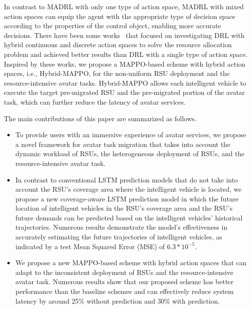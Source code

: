 \documentclass[lettersize,journal]{IEEEtran}
\begin{document}
In contrast to MADRL with only one type of action space, MADRL with mixed action spaces can equip the agent with the appropriate type of decision space according to the properties of the control object, enabling more accurate decisions. There have been some works~\cite{liang2023hybrid, qiu2022hybrid, xu2022learning} that focused on investigating DRL with hybrid continuous and discrete action spaces to solve the resource allocation problem and achieved better results than DRL with a single type of action space. Inspired by these works, we propose a MAPPO-based scheme with hybrid action spaces, i.e., Hybrid-MAPPO, for the non-uniform RSU deployment and the resource-intensive avatar tasks. Hybrid-MAPPO allows each intelligent vehicle to execute the target pre-migrated RSU and the pre-migrated portion of the avatar task, which can further reduce the latency of avatar services.

The main contributions of this paper are summarized as follows.
\begin{itemize}
\item To provide users with an immersive experience of avatar services, we propose a novel framework for avatar task migration that takes into account the dynamic workload of RSUs, the heterogeneous deployment of RSUs, and the resource-intensive avatar task.

\item In contrast to conventional LSTM prediction models that do not take into account the RSU's coverage area where the intelligent vehicle is located, we propose a new coverage-aware LSTM prediction model in which the future location of intelligent vehicles in the RSU's coverage area and the RSU's future demands can be predicted based on the intelligent vehicles' historical trajectories. Numerous results demonstrate the model’s effectiveness in accurately estimating the future trajectories of intelligent vehicles, as indicated by a test Mean Squared Error (MSE) of $6.3*10^{-5}$.

\item We propose a new MAPPO-based scheme with hybrid action spaces that can adapt to the inconsistent deployment of RSUs and the resource-intensive avatar task. Numerous results show that our proposed scheme has better performance than the baseline schemes and can effectively reduce system latency by around 25\% without prediction and 30\% with prediction.

\end{itemize}
\end{document}
